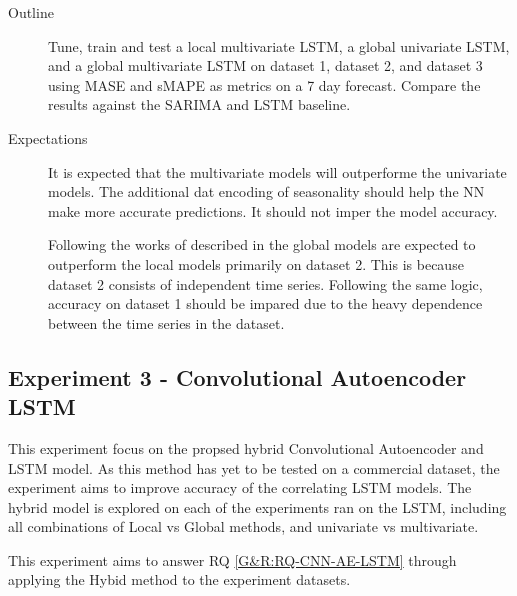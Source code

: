 \begin{description}
  \item[Outline]{
                  Tune, train and test a local multivariate LSTM, a global univariate LSTM,
                  and a global multivariate LSTM on dataset 1,
                  dataset 2, and dataset 3 using MASE and sMAPE as metrics on a 7 day forecast.
                  Compare the results against the SARIMA and LSTM baseline.
                }
\end{description}

\begin{description}
  \item[Expectations]{
              It is expected that the multivariate models will outperforme the univariate models.
              The additional dat encoding of seasonality should help the NN make more accurate predictions.
              It should not imper the model accuracy.

              Following the works of \cite{Rabanser2020} described in 
              the global models are expected to outperform the local models primarily on dataset 2.
              This is because dataset 2 consists of independent time series.
              Following the same logic, accuracy on dataset 1 should be impared due to the heavy dependence between the time series in the dataset.
        }
\end{description}





\subsection{Experiment 3 - Convolutional Autoencoder LSTM}
This experiment focus on the propsed hybrid Convolutional Autoencoder and LSTM model.
As this method has yet to be tested on a commercial dataset,
the experiment aims to improve accuracy of the correlating LSTM models.
The hybrid model is explored on each of the experiments ran on the LSTM,
including all combinations of Local vs Global methods, and univariate vs multivariate.

This experiment aims to answer RQ \cref{G&R:RQ-CNN-AE-LSTM} through applying the Hybid method
to the experiment datasets.


